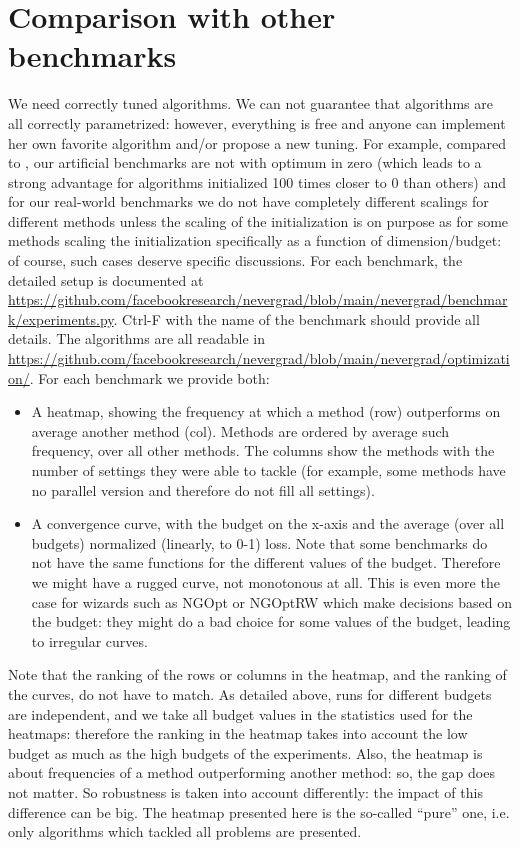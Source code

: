 \documentclass{article}
\begin{document}
\section{Comparison with other benchmarks}
We need correctly tuned algorithms. We can not guarantee that algorithms are all correctly parametrized: however, everything is free and anyone can implement her own favorite algorithm and/or propose a new tuning. For example, compared to \cite{lamcts}, our artificial benchmarks are not with optimum in zero (which leads to a strong advantage for algorithms initialized 100 times closer to 0 than others) and for our real-world benchmarks we do not have completely different scalings for different methods unless the scaling of the initialization is on purpose as for some methods scaling the initialization specifically as a function of dimension/budget: of course, such cases deserve specific discussions.
For each benchmark, the detailed setup is documented at \url{https://github.com/facebookresearch/nevergrad/blob/main/nevergrad/benchmark/experiments.py}.
Ctrl-F with the name of the benchmark should provide all details.
The algorithms are all readable in  \url{https://github.com/facebookresearch/nevergrad/blob/main/nevergrad/optimization/}.
For each benchmark we provide both:
\begin{itemize}
\item A heatmap, showing the frequency at which a method (row) outperforms on average another method (col). Methods are ordered by average such frequency, over all other methods.
The columns show the methods with the number of settings they were able to tackle (for example, some methods have no parallel version and therefore do not fill all settings).
\item A convergence curve, with the budget on the x-axis and the average (over all budgets) normalized (linearly, to
0-1) loss. Note that some benchmarks do not have the same functions for the different values of the budget. Therefore we
might have a rugged curve, not monotonous at all. This is even more the case for wizards such as NGOpt or NGOptRW which
make decisions based on the budget: they might do a bad choice for some values of the budget, leading to irregular
curves.
\end{itemize}
Note that the ranking of the rows or columns in the heatmap, and the ranking of the curves, do not have to match. As
detailed above, runs for different budgets are independent, and we take all budget values in the statistics used for the
heatmaps: therefore the ranking in the heatmap takes into account the low budget as much as the high budgets of the
experiments. Also, the heatmap is about frequencies of a method outperforming another method: so, the gap does not
matter. So robustness is taken into account differently: the impact of this difference can be big.
The heatmap presented here is the so-called ``pure'' one, i.e. only algorithms which tackled all problems are presented.
\end{document}
